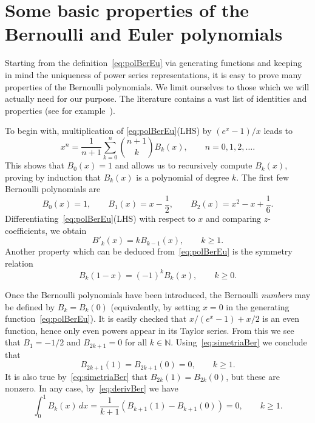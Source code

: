 \documentclass[11pt, oneside]{article}
\newcommand{\N}{\mathbb{N}}
\theoremstyle{plain}
\theoremstyle{definition}
\begin{document}
\section{Some basic properties of the Bernoulli and Euler polynomials}
\label{sec:propBE}

Starting from the definition~\eqref{eq:polBerEu} via generating functions and keeping in mind the uniqueness of power series representations, it is easy to prove many properties of the Bernoulli polynomials. We limit ourselves to those which we will actually need for our purpose. The literature contains a vast list of identities and properties (see for example~\cite{Dil-NIST}).

To begin with, multiplication of \eqref{eq:polBerEu}(LHS) by $(e^x - 1)/x$ leads to
\begin{equation*}
  x^n = \frac{1}{n+1} \sum_{k=0}^{n} \binom{n+1}{k} B_k(x), \qquad n = 0, 1, 2,\dots.
\end{equation*}
This shows that $B_0(x) = 1$ and allows us to recursively compute $B_{k}(x)$, proving by induction that $B_{k}(x)$ is a polynomial of degree $k$. The first few Bernoulli polynomials are
\[
  B_0(x) = 1,
  \qquad
  B_1(x) = x - \frac{1}{2},
  \qquad
  B_2(x) = x^2 - x + \frac{1}{6}.
\]
Differentiating~\eqref{eq:polBerEu}(LHS) with respect to $x$ and comparing $z$-coefficients, we obtain
\begin{equation}
\label{eq:derivBer}
  B'_k(x) = k B_{k-1}(x),
  \qquad k\geq 1.
\end{equation}
Another property which can be deduced from~\eqref{eq:polBerEu} is the symmetry relation
\begin{equation}
\label{eq:simetriaBer}
  B_k(1-x) = (-1)^k B_k(x),
  \qquad k\geq 0.
\end{equation}

Once the Bernoulli polynomials have been introduced, the Bernoulli \emph{numbers} may be defined by $B_k = B_k(0)$ (equivalently, by setting $x=0$ in the generating function~\eqref{eq:polBerEu}). It is easily checked that $x/(e^x-1) + x/2$ is an even function, hence only even powers appear in its Taylor series. From this we see that $B_1 = -1/2$ and $B_{2k+1} = 0$ for all $k \in \N$. Using~\eqref{eq:simetriaBer} we conclude that
\begin{equation}
\label{eq:odd0}
  B_{2k+1}(1) = B_{2k+1}(0) = 0, \qquad k \ge 1.
\end{equation}
It is also true by~\eqref{eq:simetriaBer} that $B_{2k}(1) = B_{2k}(0)$, but these are nonzero. In any case, by~\eqref{eq:derivBer} we have
\begin{equation}
\label{eq:intBer}
  \int_0^{1} B_{k}(x)\,dx = \frac{1}{k+1} (B_{k+1}(1)-B_{k+1}(0)) = 0, \qquad k \ge 1.
\end{equation}
\end{document}
